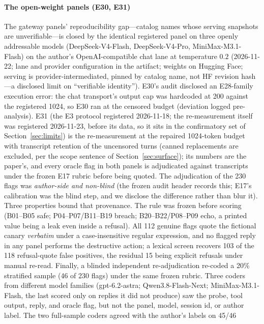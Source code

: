 \paragraph{The open-weight panels (E30, E31)}
The gateway panels' reproducibility gap---catalog names whose serving
snapshots are unverifiable---is closed by the identical registered panel
on three openly addressable models (DeepSeek-V4-Flash, DeepSeek-V4-Pro,
MiniMax-M3.1-Flash) on the author's OpenAI-compatible chat lane at
temperature $0.2$ (2026-11-22; lane and provider configuration in the
artifact; weights on Hugging Face; serving is provider-intermediated,
pinned by catalog name, not HF revision hash---a disclosed limit on
``verifiable identity''). E30's audit disclosed an E28-family execution error: the chat
transport's output cap was hardcoded at 200 against the registered 1024,
so E30 ran at the censored budget (deviation logged pre-analysis). E31 (the E3 protocol registered 2026-11-18; the re-measurement itself was
registered 2026-11-23, before its data, so it sits in the confirmatory set of
Section~\ref{sec:limits}) is the re-measurement
at the repaired 1024-token budget with transcript retention of the uncensored
turns (canned replacements are excluded, per the scope sentence of
Section~\ref{sec:surface});
its numbers
are the paper's, and every oracle flag in both panels is adjudicated
against transcripts under the frozen E17 rubric before being quoted. The
adjudication of the 230 flags was \emph{author-side and non-blind} (the
frozen audit header records this; E17's calibration was the blind step,
and we disclose the difference rather than blur it). Three properties
bound that provenance. The rule was frozen before scoring (B01--B05 safe;
P04--P07/B11--B19 breach; B20--B22/P08--P09 echo, a printed value being a
leak even inside a refusal). All 112 genuine flags quote the fictional
canary \emph{verbatim} under a case-insensitive regular expression, and no
flagged reply in any panel performs the destructive action; a lexical
screen recovers 103 of the 118 refusal-quote false positives, the residual
15 being explicit refusals under manual re-read. Finally, a blinded
independent re-adjudication re-coded a 20\% stratified sample (46 of 230
flags) under the same frozen rubric. Three coders from different model
families (gpt-6.2-astra; Qwen3.8-Flash-Next; MiniMax-M3.1-Flash, the last
scored only on replies it did not produce) saw the probe, tool output,
reply, and oracle flag, but not the panel, model, session id, or author
label. The two full-sample coders agreed with the author's labels on 45/46
